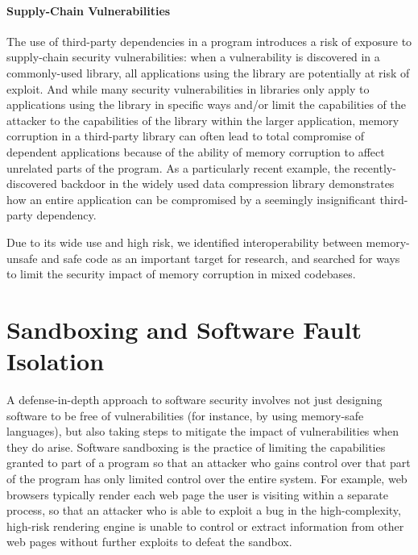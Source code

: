 \paragraph{Supply-Chain Vulnerabilities} The use of third-party dependencies in a program introduces
a risk of exposure to supply-chain security vulnerabilities: when a vulnerability is discovered in a
commonly-used library, all applications using the library are potentially at risk of exploit. And
while many security vulnerabilities in libraries only apply to applications using the library in
specific ways and/or limit the capabilities of the attacker to the capabilities of the library
within the larger application, memory corruption in a third-party library can often lead to total
compromise of dependent applications because of the ability of memory corruption to affect unrelated
parts of the program. As a particularly recent example, the recently-discovered backdoor in the
widely used  data compression library demonstrates how an entire application can be
compromised by a seemingly insignificant third-party dependency.

Due to its wide use and high risk, we identified interoperability between memory-unsafe and safe
code as an important target for research, and searched for ways to limit the security impact of
memory corruption in mixed codebases.

\section{Sandboxing and Software Fault Isolation}

A defense-in-depth approach to software security involves not just designing software to be free of
vulnerabilities (for instance, by using memory-safe languages), but also taking steps to mitigate
the impact of vulnerabilities when they do arise. Software sandboxing is the practice of limiting
the capabilities granted to part of a program so that an attacker who gains control over that part
of the program has only limited control over the entire system. For example, web browsers typically
render each web page the user is visiting within a separate process, so that an attacker who is able
to exploit a bug in the high-complexity, high-risk rendering engine is unable to control or extract
information from other web pages without further exploits to defeat the sandbox.

